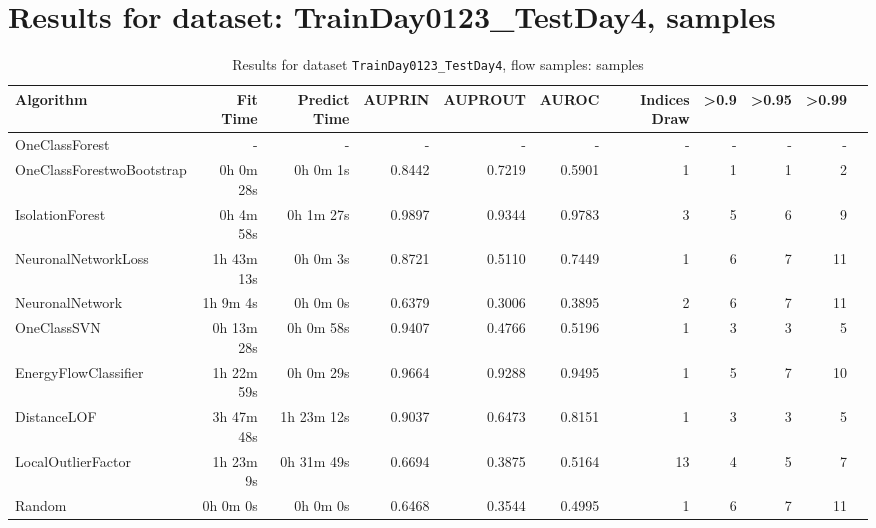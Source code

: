 \documentclass{article}
\begin{document}
\section*{Results for dataset: TrainDay0123_TestDay4, samples}
\begin{table}[h!]
\centering
\caption{Results for dataset \texttt{TrainDay0123_TestDay4}, flow samples: samples}
\label{tab:trainday0123testday4_samples}
\begin{tabular}{lrrrrrrrrrr}
\toprule
Algorithm & Fit Time & Predict Time & AUPRIN & AUPROUT & AUROC & Indices Draw & >0.9 & >0.95 & >0.99 \\
\midrule
OneClassForest & - & - & - & - & - & - & - & - & - \\
OneClassForestwoBootstrap & 0h 0m 28s & 0h 0m 1s & 0.8442 & 0.7219 & 0.5901 & 1 & 1 & 1 & 2 \\
IsolationForest & 0h 4m 58s & 0h 1m 27s & 0.9897 & 0.9344 & 0.9783 & 3 & 5 & 6 & 9 \\
NeuronalNetworkLoss & 1h 43m 13s & 0h 0m 3s & 0.8721 & 0.5110 & 0.7449 & 1 & 6 & 7 & 11 \\
NeuronalNetwork & 1h 9m 4s & 0h 0m 0s & 0.6379 & 0.3006 & 0.3895 & 2 & 6 & 7 & 11 \\
OneClassSVN & 0h 13m 28s & 0h 0m 58s & 0.9407 & 0.4766 & 0.5196 & 1 & 3 & 3 & 5 \\
EnergyFlowClassifier & 1h 22m 59s & 0h 0m 29s & 0.9664 & 0.9288 & 0.9495 & 1 & 5 & 7 & 10 \\
DistanceLOF & 3h 47m 48s & 1h 23m 12s & 0.9037 & 0.6473 & 0.8151 & 1 & 3 & 3 & 5 \\
LocalOutlierFactor & 1h 23m 9s & 0h 31m 49s & 0.6694 & 0.3875 & 0.5164 & 13 & 4 & 5 & 7 \\
Random & 0h 0m 0s & 0h 0m 0s & 0.6468 & 0.3544 & 0.4995 & 1 & 6 & 7 & 11 \\
\bottomrule
\end{tabular}
\end{table}
\end{document}
